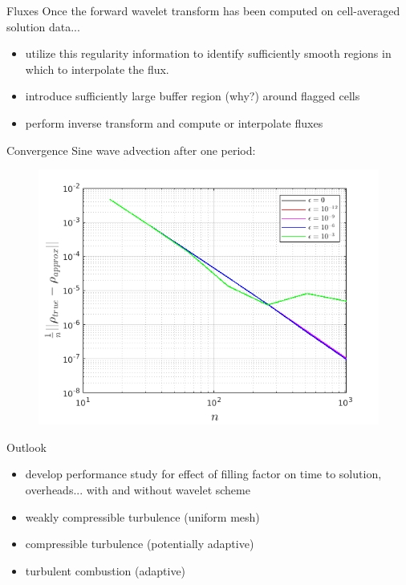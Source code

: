 \documentclass{beamer}
\begin{document}
\begin{frame}{Fluxes}
    Once the forward wavelet transform has been computed on cell-averaged solution data...
    \begin{itemize}
        \item<2-> utilize this regularity information to identify sufficiently smooth regions
            in which to interpolate the flux.
        \item<3-> introduce sufficiently large buffer region (why?) around flagged cells
        \item<4-> perform inverse transform and compute or interpolate fluxes
    \end{itemize}
\end{frame}

\begin{frame}{Convergence}
  Sine wave advection after one period:
  \begin{figure}
    \center
    \includegraphics[scale=0.5]{convergence.png}
  \end{figure}
\end{frame}

\begin{frame}{Outlook}
  \begin{itemize}
    \item develop performance study for effect of filling factor on time to
          solution, overheads... with and without wavelet scheme
    \item weakly compressible turbulence (uniform mesh)
    \item compressible turbulence (potentially adaptive)
    \item turbulent combustion (adaptive)
  \end{itemize}
\end{frame}
  
\end{document}
